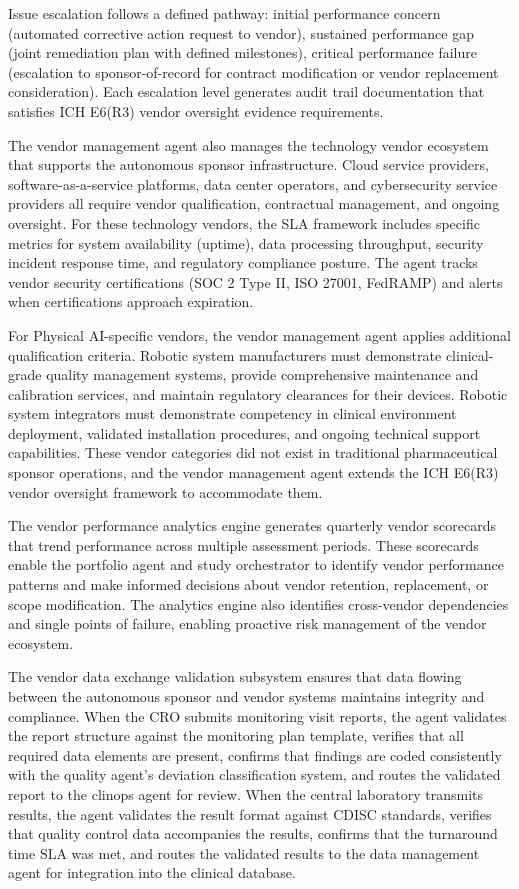 Issue escalation follows a defined pathway: initial performance concern (automated
corrective action request to vendor), sustained performance gap (joint remediation plan
with defined milestones), critical performance failure (escalation to sponsor-of-record
for contract modification or vendor replacement consideration). Each escalation level
generates audit trail documentation that satisfies ICH E6(R3) vendor oversight evidence
requirements.

The vendor management agent also manages the technology vendor ecosystem that supports the
autonomous sponsor infrastructure. Cloud service providers, software-as-a-service platforms,
data center operators, and cybersecurity service providers all require vendor qualification,
contractual management, and ongoing oversight. For these technology vendors, the SLA framework
includes specific metrics for system availability (uptime), data processing throughput,
security incident response time, and regulatory compliance posture. The agent tracks vendor
security certifications (SOC 2 Type II, ISO 27001, FedRAMP) and alerts when certifications
approach expiration.

For Physical AI-specific vendors, the vendor management agent applies additional qualification
criteria. Robotic system manufacturers must demonstrate clinical-grade quality management
systems, provide comprehensive maintenance and calibration services, and maintain regulatory
clearances for their devices. Robotic system integrators must demonstrate competency in
clinical environment deployment, validated installation procedures, and ongoing technical
support capabilities. These vendor categories did not exist in traditional pharmaceutical
sponsor operations, and the vendor management agent extends the ICH E6(R3) vendor oversight
framework to accommodate them.

The vendor performance analytics engine generates quarterly vendor scorecards that trend
performance across multiple assessment periods. These scorecards enable the portfolio agent
and study orchestrator to identify vendor performance patterns and make informed decisions
about vendor retention, replacement, or scope modification. The analytics engine also
identifies cross-vendor dependencies and single points of failure, enabling proactive risk
management of the vendor ecosystem.

The vendor data exchange validation subsystem ensures that data flowing between the
autonomous sponsor and vendor systems maintains integrity and compliance. When the CRO
submits monitoring visit reports, the agent validates the report structure against the
monitoring plan template, verifies that all required data elements are present, confirms
that findings are coded consistently with the quality agent's deviation classification
system, and routes the validated report to the clinops agent for review. When the central
laboratory transmits results, the agent validates the result format against CDISC
standards, verifies that quality control data accompanies the results, confirms that the
turnaround time SLA was met, and routes the validated results to the data management
agent for integration into the clinical database.

